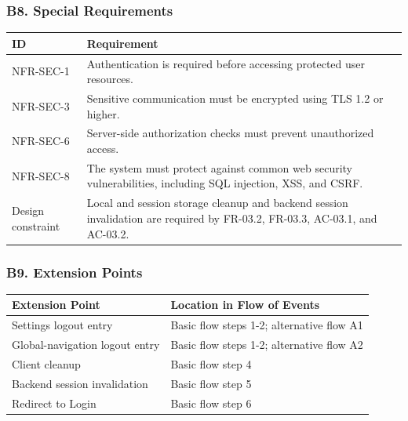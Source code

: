 \documentclass[12pt]{article}
\renewcommand{\baselinestretch}{1.5}
\begin{document}
\hypertarget{sec:b8-special-requirements}{}
\subsubsection*{B8. Special Requirements}
\par\medskip

\begingroup
\small
\renewcommand{\baselinestretch}{1.0}\selectfont
\renewcommand{\arraystretch}{1.15}
\setlength{\tabcolsep}{6pt}
\begin{longtable}{|>{\raggedright\arraybackslash}p{}|>{\raggedright\arraybackslash}p{}|}
\hline
\textbf{ID} & \textbf{Requirement} \\ \hline
\endhead
NFR-SEC-1 & Authentication is required before accessing protected user resources. \\ \hline
NFR-SEC-3 & Sensitive communication must be encrypted using TLS 1.2 or higher. \\ \hline
NFR-SEC-6 & Server-side authorization checks must prevent unauthorized access. \\ \hline
NFR-SEC-8 & The system must protect against common web security vulnerabilities, including SQL injection, XSS, and CSRF. \\ \hline
Design constraint & Local and session storage cleanup and backend session invalidation are required by FR-03.2, FR-03.3, AC-03.1, and AC-03.2. \\ \hline
\end{longtable}
\endgroup
\par\medskip

\hypertarget{sec:b9-extension-points}{}
\subsubsection*{B9. Extension Points}
\par\medskip

\begingroup
\small
\renewcommand{\baselinestretch}{1.0}\selectfont
\renewcommand{\arraystretch}{1.15}
\setlength{\tabcolsep}{6pt}
\begin{longtable}{|>{\raggedright\arraybackslash}p{}|>{\raggedright\arraybackslash}p{}|}
\hline
\textbf{Extension Point} & \textbf{Location in Flow of Events} \\ \hline
\endhead
Settings logout entry & Basic flow steps 1-2; alternative flow A1 \\ \hline
Global-navigation logout entry & Basic flow steps 1-2; alternative flow A2 \\ \hline
Client cleanup & Basic flow step 4 \\ \hline
Backend session invalidation & Basic flow step 5 \\ \hline
Redirect to Login & Basic flow step 6 \\ \hline
\end{longtable}
\endgroup
\par\medskip
\end{document}
